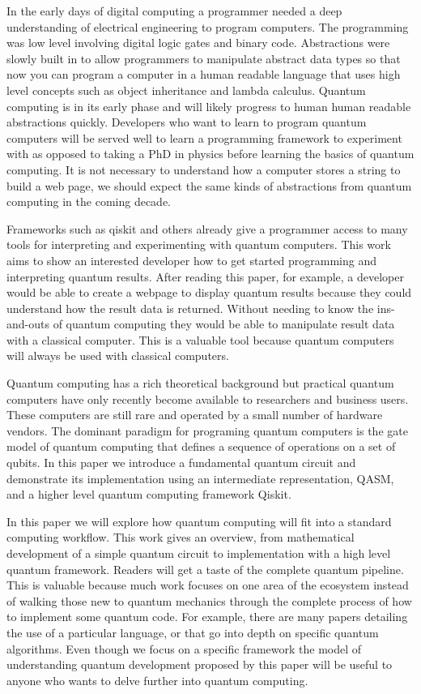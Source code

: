 \documentclass[conference]{IEEEtran}
\begin{document}
In the early days of digital computing a programmer needed a deep understanding of electrical engineering to program computers. The programming was low level involving digital logic gates and binary code. Abstractions were slowly built in to allow programmers to manipulate abstract data types so that now you can program a computer in a human readable language that uses high level concepts such as object inheritance and lambda calculus. Quantum computing is in its early phase and will likely progress to human human readable abstractions quickly. Developers who want to learn to program quantum computers will be served well to learn a programming framework to experiment with as opposed to taking a PhD in physics before learning the basics of quantum computing. It is not necessary to understand how a computer stores a string to build a web page, we should expect the same kinds of abstractions from quantum computing in the coming decade.

Frameworks such as qiskit and others already give a programmer access to many tools for interpreting and experimenting with quantum computers. This work aims to show an interested developer how to get started programming and interpreting quantum results. After reading this paper, for example, a developer would be able to create a webpage to display quantum results because they could understand how the result data is returned. Without needing to know the ins-and-outs of quantum computing they would be able to manipulate result data with a classical computer. This is a valuable tool because quantum computers will always be used with classical computers.

Quantum computing has a rich theoretical background but practical quantum computers have only recently become available to researchers and business users. These computers are still rare and operated by a small number of hardware vendors. The dominant paradigm for programing quantum computers is the gate model of quantum computing that defines a sequence of operations on a set of qubits. In this paper we introduce a fundamental quantum circuit and demonstrate its implementation using an intermediate representation, QASM, and a higher level quantum computing framework Qiskit. 

In this paper we will explore how quantum computing will fit into a standard computing workflow. This work gives an overview, from mathematical development of a simple quantum circuit to implementation with a high level quantum framework. Readers will get a taste of the complete quantum pipeline. This is valuable because much work focuses on one area of the ecosystem instead of walking those new to quantum mechanics through the complete process of how to implement some quantum code. For example, there are many papers detailing the use of a particular language, or that go into depth on specific quantum algorithms. Even though we focus on a specific framework the model of understanding quantum development proposed by this paper will be useful to anyone who wants to delve further into quantum computing. 
\end{document}
